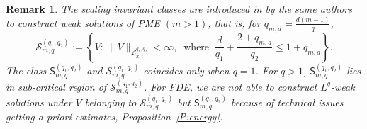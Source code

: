\documentclass{amsart}
\newtheorem{remark}[defn]{Remark}
\numberwithin{equation}{section}
\begin{document}
\begin{remark}\label{R:Scaling}
The scaling invariant classes are introduced in \cite{HKK01, HKK02} by the same authors to construct weak solutions of PME $(m>1)$, that is, for $q_{m,d} = \frac{d(m-1)}{q}$,
    \begin{equation}\label{Scaling_invariant_class}
 \mathcal{S}_{m,q}^{(q_1, q_2)}:= \left\{ V: \ \|V\|_{\mathcal{L}^{q_1, q_2}_{x,t}} < \infty, \ \text{ where } \ \frac{d}{q_1} + \frac{2 + q_{m,d}}{q_2} \leq 1 + q_{m,d}\right\}.
\end{equation}  
    The class $\mathsf{S}_{m,q}^{(q_1,q_2)}$ and $\mathcal{S}_{m,q}^{(q_1,q_2)}$ coincides only when $q=1$. For $q>1$, $\mathsf{S}_{m,q}^{(q_1,q_2)}$ lies in sub-critical region of $\mathcal{S}_{m,q}^{(q_1,q_2)}$. For FDE, we are not able to construct $L^q$-weak solutions under $V$ belonging to $\mathcal{S}_{m,q}^{(q_1, q_2)}$ but $\mathsf{S}_{m,q}^{(q_1, q_2)}$ because of technical issues getting a priori estimates, Proposition~\ref{P:energy}.
\end{remark}	
\end{document}
